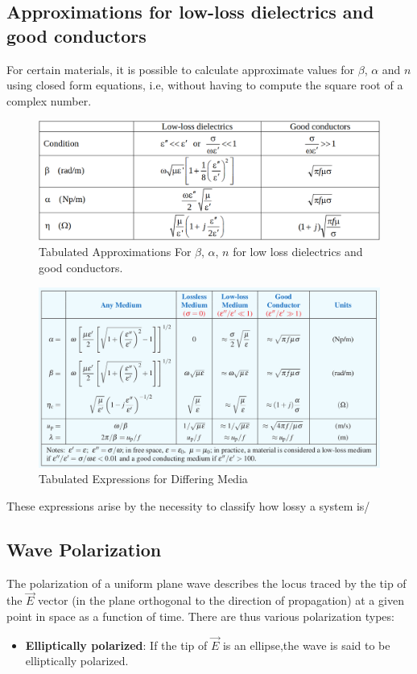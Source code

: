 \documentclass{book}
\begin{document}
\subsection{Approximations for low-loss dielectrics and good conductors}

For certain materials, it is possible to calculate approximate values for $\beta$, $\alpha$ and $n$ using closed form equations, i.e, without having to compute the square root of a complex number. 

\begin{figure}[h]
	\centering
	\includegraphics[width=0.6\linewidth]{Screenshots/approximations_for_good_conductors}
	\caption{Tabulated Approximations For $\beta$, $\alpha$, $n$ for low loss dielectrics and good conductors.}
	\label{fig:approximationsforgoodconductors}
\end{figure}

\begin{figure}[h]
	\centering
	\includegraphics[width=0.5\linewidth]{Screenshots/tabulated_expressions_2}
	\caption{Tabulated Expressions for Differing Media}
	\label{fig:tabulatedexpressions2}
\end{figure}


These expressions arise by the necessity to classify how lossy a system is/

\subsection{Wave Polarization}

The polarization of a uniform plane wave describes the locus traced by the tip of the $\vec{E}$ vector (in the plane orthogonal to the direction of propagation) at a given point in space as a function of time. There are thus various polarization types:

\begin{itemize}
	\item \textbf{Elliptically polarized}: If the tip of $\vec{E}$ is an ellipse,the wave is said to be elliptically polarized.
\end{itemize}
\end{document}

